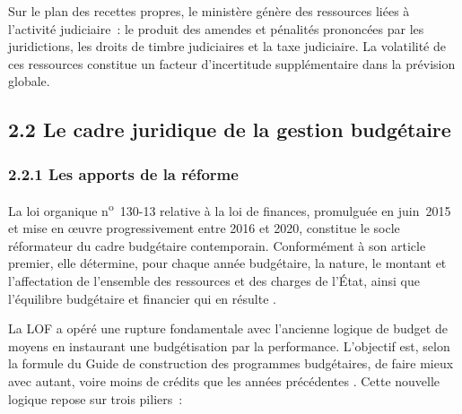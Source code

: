 Sur le plan des recettes propres, le minist\`ere g\'en\`ere des ressources li\'ees \`a l'activit\'e judiciaire~: le produit des amendes et p\'enalit\'es prononc\'ees par les juridictions, les droits de timbre judiciaires et la taxe judiciaire. La volatilit\'e de ces ressources constitue un facteur d'incertitude suppl\'ementaire dans la pr\'evision globale.

\subsection*{2.2 \quad Le cadre juridique de la gestion budg\'etaire}

\subsubsection*{2.2.1 \quad Les apports de la r\'eforme}

La loi organique n\textsuperscript{o}~130-13 relative \`a la loi de finances, promulgu\'ee en juin~2015 et mise en \oe{}uvre progressivement entre 2016 et 2020, constitue le socle r\'eformateur du cadre budg\'etaire contemporain. Conform\'ement \`a son article premier, elle \og{}d\'etermine, pour chaque ann\'ee budg\'etaire, la nature, le montant et l'affectation de l'ensemble des ressources et des charges de l'\'Etat, ainsi que l'\'equilibre budg\'etaire et financier qui en r\'esulte\fg{} \citep{MEF2015}.

La LOF a op\'er\'e une rupture fondamentale avec l'ancienne logique de \og{}budget de moyens\fg{} en instaurant une \og{}budg\'etisation par la performance\fg{}. L'objectif est, selon la formule du Guide de construction des programmes budg\'etaires, de \og{}faire mieux avec autant, voire moins de cr\'edits que les ann\'ees pr\'ec\'edentes\fg{} \citep{MEF2015b}. Cette nouvelle logique repose sur trois piliers~:

